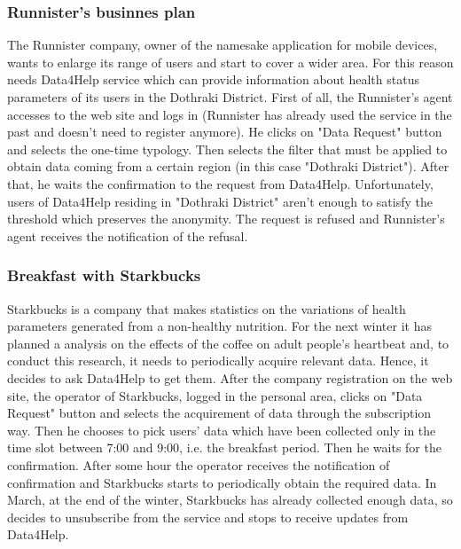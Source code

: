 \documentclass[a4paper]{article}
\begin{document}
    \subsubsection{Runnister's businnes plan}
    The Runnister company, owner of the namesake application for mobile devices, wants to enlarge its range of users and start to cover a wider area. For this reason needs Data4Help service which can provide information about health status parameters of its users in the Dothraki District. \newline
    First of all, the Runnister's agent accesses to the web site and logs in (Runnister has already used the service in the past and doesn't need to register anymore). He clicks on "Data Request" button and selects the one-time typology. Then selects the filter that must be applied to obtain data coming from a certain region (in this case "Dothraki District"). After that, he waits the confirmation to the request from Data4Help. \newline
    Unfortunately, users of Data4Help residing in "Dothraki District" aren't enough to satisfy the threshold which preserves the anonymity. The request is refused and Runnister's agent receives the notification of the refusal.
    
    \subsubsection{Breakfast with Starkbucks}
    Starkbucks is a company that makes statistics on the variations of health parameters generated from a non-healthy nutrition. For the next winter it has planned a analysis on the effects of the coffee on adult people's heartbeat and, to conduct this research, it needs to periodically acquire relevant data. Hence, it decides to ask Data4Help to get them. \newline 
    After the company registration on the web site, the operator of Starkbucks, logged in the personal area, clicks on "Data Request" button and selects the acquirement of data through the subscription way. Then he chooses to pick users' data which have been collected only in the time slot between 7:00 and 9:00, i.e. the breakfast period. Then he waits for the confirmation. After some hour the operator receives the notification of confirmation and Starkbucks starts to periodically obtain the required data. \newline
    In March, at the end of the winter, Starkbucks has already collected enough data, so decides to unsubscribe from the service and stops to receive updates from Data4Help. 
    
\end{document}
